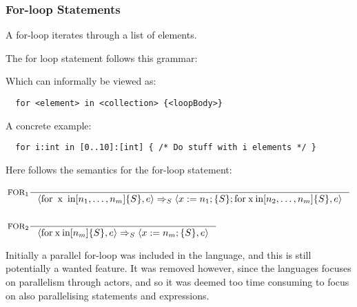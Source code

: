 \subsubsection{For-loop Statements}
\label{subsec:forLoopStatements}

A for-loop iterates through a list of elements.

The for loop statement follows this grammar:


Which can informally be viewed as:

\begin{verbatim}
  for <element> in <collection> {<loopBody>}
\end{verbatim}

A concrete example:

\begin{verbatim}
  for i:int in [0..10]:[int] { /* Do stuff with i elements */ }
\end{verbatim}

Here follows the semantics for the for-loop statement:

\begin{align*}
&\inference[$\text{FOR}_{1}$]{}
                       {\Braket{\Tfor \Tx \Tin [n_1,\dots,n_m]\{S\},e} \Rightarrow_S \Braket{x := n_1;\{S\}; \Tfor \mathbin{\text{x}} \mathbin{\text{in}} [n_2,\dots,n_m]\{S\},e}}
\\\\
&\inference[$\text{FOR}_{2}$]{}
                       {\Braket{\Tfor \mathbin{\text{x}}\mathbin{\text{in}} [n_m]\{S\},e} \Rightarrow_S \Braket{x := n_m;\{S\},e}}
\end{align*}

Initially a parallel for-loop was included in the language, and this is still potentially a wanted feature. It was removed however, since the languages focuses on parallelism through actors, and so it was deemed too time consuming to focus on also parallelising statements and expressions.